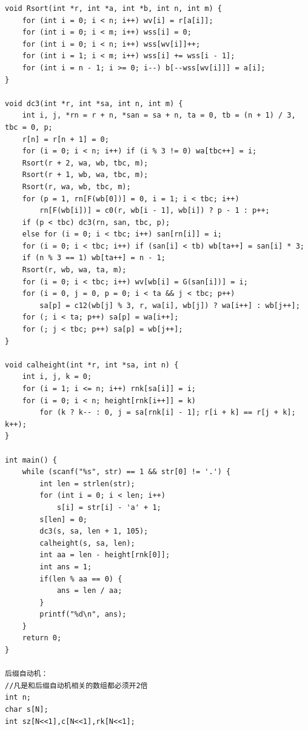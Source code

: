 \documentclass[twoside]{article}
\begin{document}
\begin{lstlisting}
void Rsort(int *r, int *a, int *b, int n, int m) {
    for (int i = 0; i < n; i++) wv[i] = r[a[i]];
    for (int i = 0; i < m; i++) wss[i] = 0;
    for (int i = 0; i < n; i++) wss[wv[i]]++;
    for (int i = 1; i < m; i++) wss[i] += wss[i - 1];
    for (int i = n - 1; i >= 0; i--) b[--wss[wv[i]]] = a[i];
}

void dc3(int *r, int *sa, int n, int m) {
    int i, j, *rn = r + n, *san = sa + n, ta = 0, tb = (n + 1) / 3, tbc = 0, p;
    r[n] = r[n + 1] = 0;
    for (i = 0; i < n; i++) if (i % 3 != 0) wa[tbc++] = i;
    Rsort(r + 2, wa, wb, tbc, m);
    Rsort(r + 1, wb, wa, tbc, m);
    Rsort(r, wa, wb, tbc, m);
    for (p = 1, rn[F(wb[0])] = 0, i = 1; i < tbc; i++)
        rn[F(wb[i])] = c0(r, wb[i - 1], wb[i]) ? p - 1 : p++;
    if (p < tbc) dc3(rn, san, tbc, p);
    else for (i = 0; i < tbc; i++) san[rn[i]] = i;
    for (i = 0; i < tbc; i++) if (san[i] < tb) wb[ta++] = san[i] * 3;
    if (n % 3 == 1) wb[ta++] = n - 1;
    Rsort(r, wb, wa, ta, m);
    for (i = 0; i < tbc; i++) wv[wb[i] = G(san[i])] = i;
    for (i = 0, j = 0, p = 0; i < ta && j < tbc; p++)
        sa[p] = c12(wb[j] % 3, r, wa[i], wb[j]) ? wa[i++] : wb[j++];
    for (; i < ta; p++) sa[p] = wa[i++];
    for (; j < tbc; p++) sa[p] = wb[j++];
}

void calheight(int *r, int *sa, int n) {
    int i, j, k = 0;
    for (i = 1; i <= n; i++) rnk[sa[i]] = i;
    for (i = 0; i < n; height[rnk[i++]] = k)
        for (k ? k-- : 0, j = sa[rnk[i] - 1]; r[i + k] == r[j + k]; k++);
}

int main() {
    while (scanf("%s", str) == 1 && str[0] != '.') {
        int len = strlen(str);
        for (int i = 0; i < len; i++)
            s[i] = str[i] - 'a' + 1;
        s[len] = 0;
        dc3(s, sa, len + 1, 105);
        calheight(s, sa, len);
        int aa = len - height[rnk[0]];
        int ans = 1;
        if(len % aa == 0) {
            ans = len / aa;
        }
        printf("%d\n", ans);
    }
    return 0;
}

后缀自动机：
//凡是和后缀自动机相关的数组都必须开2倍
int n;
char s[N];
int sz[N<<1],c[N<<1],rk[N<<1];


\end{lstlisting}
\end{document}
